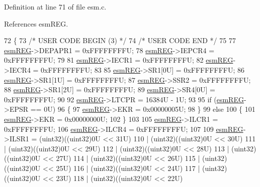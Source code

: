 Definition at line 71 of file esm.\+c.



References esm\+R\+EG.


\begin{DoxyCode}
72 \{
73 \textcolor{comment}{/* USER CODE BEGIN (3) */}
74 \textcolor{comment}{/* USER CODE END */}
75 
77     \mbox{\hyperlink{reg__esm_8h_a7c2e779f2973e0c2c9496a4796df10f1}{esmREG}}->DEPAPR1 = 0xFFFFFFFFU;
78     \mbox{\hyperlink{reg__esm_8h_a7c2e779f2973e0c2c9496a4796df10f1}{esmREG}}->IEPCR4 = 0xFFFFFFFFU;
79 
81     \mbox{\hyperlink{reg__esm_8h_a7c2e779f2973e0c2c9496a4796df10f1}{esmREG}}->IECR1 = 0xFFFFFFFFU;
82     \mbox{\hyperlink{reg__esm_8h_a7c2e779f2973e0c2c9496a4796df10f1}{esmREG}}->IECR4 = 0xFFFFFFFFU;
83 
85     \mbox{\hyperlink{reg__esm_8h_a7c2e779f2973e0c2c9496a4796df10f1}{esmREG}}->SR1[0U] = 0xFFFFFFFFU;
86     \mbox{\hyperlink{reg__esm_8h_a7c2e779f2973e0c2c9496a4796df10f1}{esmREG}}->SR1[1U] = 0xFFFFFFFFU;
87     \mbox{\hyperlink{reg__esm_8h_a7c2e779f2973e0c2c9496a4796df10f1}{esmREG}}->SSR2  = 0xFFFFFFFFU;
88     \mbox{\hyperlink{reg__esm_8h_a7c2e779f2973e0c2c9496a4796df10f1}{esmREG}}->SR1[2U] = 0xFFFFFFFFU;
89     \mbox{\hyperlink{reg__esm_8h_a7c2e779f2973e0c2c9496a4796df10f1}{esmREG}}->SR4[0U] = 0xFFFFFFFFU;
90 
92     \mbox{\hyperlink{reg__esm_8h_a7c2e779f2973e0c2c9496a4796df10f1}{esmREG}}->LTCPR = 16384U - 1U;
93 
95     \textcolor{keywordflow}{if} (\mbox{\hyperlink{reg__esm_8h_a7c2e779f2973e0c2c9496a4796df10f1}{esmREG}}->EPSR == 0U)
96     \{
97         \mbox{\hyperlink{reg__esm_8h_a7c2e779f2973e0c2c9496a4796df10f1}{esmREG}}->EKR = 0x00000005U;
98     \}
99     \textcolor{keywordflow}{else}
100     \{
101         \mbox{\hyperlink{reg__esm_8h_a7c2e779f2973e0c2c9496a4796df10f1}{esmREG}}->EKR = 0x00000000U;
102     \}
103 
105     \mbox{\hyperlink{reg__esm_8h_a7c2e779f2973e0c2c9496a4796df10f1}{esmREG}}->ILCR1 = 0xFFFFFFFFU;
106     \mbox{\hyperlink{reg__esm_8h_a7c2e779f2973e0c2c9496a4796df10f1}{esmREG}}->ILCR4 = 0xFFFFFFFFU;
107 
109     \mbox{\hyperlink{reg__esm_8h_a7c2e779f2973e0c2c9496a4796df10f1}{esmREG}}->ILSR1 = (uint32)((uint32)0U << 31U)
110                   | (uint32)((uint32)0U << 30U)
111                   | (uint32)((uint32)0U << 29U)
112                   | (uint32)((uint32)0U << 28U)
113                   | (uint32)((uint32)0U << 27U)
114                   | (uint32)((uint32)0U << 26U)
115                   | (uint32)((uint32)0U << 25U)
116                   | (uint32)((uint32)0U << 24U)
117                   | (uint32)((uint32)0U << 23U)
118                   | (uint32)((uint32)0U << 22U)

\end{DoxyCode}
